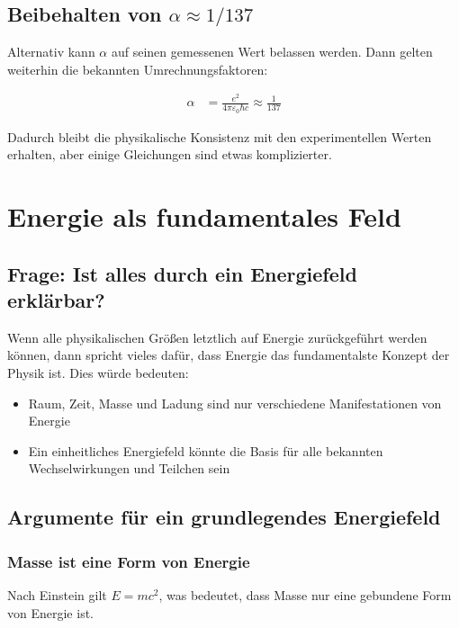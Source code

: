 \documentclass{article}
\begin{document}
	\subsection*{Beibehalten von \( \alpha \approx 1/137 \)}
	
	Alternativ kann \( \alpha \) auf seinen gemessenen Wert belassen werden. Dann gelten weiterhin die bekannten Umrechnungsfaktoren:
	
	\begin{align*}
		\alpha &= \frac{e^2}{4\pi \varepsilon_0 \hbar c} \approx \frac{1}{137}
	\end{align*}
	
	Dadurch bleibt die physikalische Konsistenz mit den experimentellen Werten erhalten, aber einige Gleichungen sind etwas komplizierter.
	
	\section{Energie als fundamentales Feld}
	
	\subsection{Frage: Ist alles durch ein Energiefeld erklärbar?}
	
	Wenn alle physikalischen Größen letztlich auf Energie zurückgeführt werden können, dann spricht vieles dafür, dass Energie das fundamentalste Konzept der Physik ist. Dies würde bedeuten:
	
	\begin{itemize}
		\item Raum, Zeit, Masse und Ladung sind nur verschiedene Manifestationen von Energie
		\item Ein einheitliches Energiefeld könnte die Basis für alle bekannten Wechselwirkungen und Teilchen sein
	\end{itemize}
	
	\subsection{Argumente für ein grundlegendes Energiefeld}
	
	\subsubsection{Masse ist eine Form von Energie}
	Nach Einstein gilt $E = mc^2$, was bedeutet, dass Masse nur eine gebundene Form von Energie ist.
	
\end{document}
